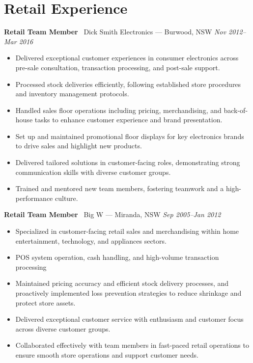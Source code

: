\documentclass[a4paper,10pt]{article}
\begin{document}
\section*{Retail Experience}
\textbf{Retail Team Member} \textbar\ Dick Smith Electronics --- Burwood, NSW \hfill \textit{Nov 2012--Mar 2016}
\begin{itemize}
\item Delivered exceptional customer experiences in consumer electronics across pre-sale consultation, transaction processing, and post-sale support.
\item Processed stock deliveries efficiently, following established store procedures and inventory management protocols.
\item Handled sales floor operations including pricing, merchandising, and back-of-house tasks to enhance customer experience and brand presentation.
\item Set up and maintained promotional floor displays for key electronics brands to drive sales and highlight new products.
\item Delivered tailored solutions in customer-facing roles, demonstrating strong communication skills with diverse customer groups.
\item Trained and mentored new team members, fostering teamwork and a high-performance culture.
\end{itemize}
\textbf{Retail Team Member} \textbar\ Big W --- Miranda, NSW \hfill \textit{Sep 2005--Jan 2012}
\begin{itemize}
\item Specialized in customer-facing retail sales and merchandising within home entertainment, technology, and appliances sectors.
\item POS system operation, cash handling, and high-volume transaction processing
\item Maintained pricing accuracy and efficient stock delivery processes, and proactively implemented loss prevention strategies to reduce shrinkage and protect store assets.
\item Delivered exceptional customer service with enthusiasm and customer focus across diverse customer groups.
\item Collaborated effectively with team members in fast-paced retail operations to ensure smooth store operations and support customer needs.
\end{itemize}
\end{document}
